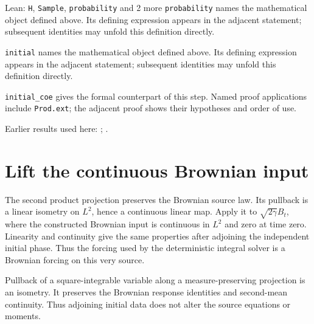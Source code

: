 \documentclass[11pt,a4paper]{article}
\begin{document}
\begin{leanbox}{Lean: \texttt{H}, \texttt{Sample}, \texttt{probability} and 2 more}
\texttt{probability} names the mathematical object defined above. Its defining expression appears in the adjacent statement; subsequent identities may unfold this definition directly.




\texttt{initial} names the mathematical object defined above. Its defining expression appears in the adjacent statement; subsequent identities may unfold this definition directly.




\texttt{initial\_\allowbreak{}coe} gives the formal counterpart of this step. Named proof applications include \texttt{Prod.\allowbreak{}ext}; the adjacent proof shows their hypotheses and order of use.
\end{leanbox}


Earlier results used here: \cite[Section~3.8.16]{LangevinLean2026ULASC}; \cite[Section~3.8.17]{LangevinLean2026ULASC}.

\section{\texorpdfstring{Lift the continuous Brownian input}{Lift the continuous Brownian input}}


The second product projection preserves the Brownian source law. Its pullback is a linear isometry on \(L^{2}\), hence a continuous linear map. Apply it to \(\sqrt{2\gamma}B_t\), where the constructed Brownian input is continuous in \(L^{2}\) and zero at time zero. Linearity and continuity give the same properties after adjoining the independent initial phase. Thus the forcing used by the deterministic integral solver is a Brownian forcing on this very source.



Pullback of a square-integrable variable along a measure-preserving projection is an isometry. It preserves the Brownian response identities and second-mean continuity. Thus adjoining initial data does not alter the source equations or moments.
\end{document}
